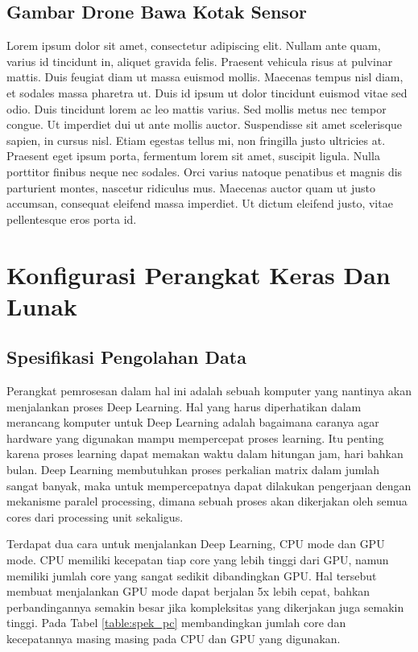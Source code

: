 \subsection{ Gambar Drone Bawa Kotak Sensor}
Lorem ipsum dolor sit amet, consectetur adipiscing elit. Nullam ante quam, varius id tincidunt in, aliquet gravida felis. Praesent vehicula risus at pulvinar mattis. Duis feugiat diam ut massa euismod mollis. Maecenas tempus nisl diam, et sodales massa pharetra ut. Duis id ipsum ut dolor tincidunt euismod vitae sed odio. Duis tincidunt lorem ac leo mattis varius. Sed mollis metus nec tempor congue. Ut imperdiet dui ut ante mollis auctor. Suspendisse sit amet scelerisque sapien, in cursus nisl. Etiam egestas tellus mi, non fringilla justo ultricies at. Praesent eget ipsum porta, fermentum lorem sit amet, suscipit ligula. Nulla porttitor finibus neque nec sodales. Orci varius natoque penatibus et magnis dis parturient montes, nascetur ridiculus mus. Maecenas auctor quam ut justo accumsan, consequat eleifend massa imperdiet. Ut dictum eleifend justo, vitae pellentesque eros porta id.

\section{ Konfigurasi Perangkat Keras Dan Lunak}
\subsection{ Spesifikasi Pengolahan Data}
Perangkat pemrosesan dalam hal ini adalah sebuah komputer yang nantinya akan menjalankan proses Deep Learning. Hal yang harus diperhatikan dalam merancang komputer untuk Deep Learning adalah bagaimana caranya agar hardware yang digunakan mampu mempercepat proses learning. Itu penting karena proses learning dapat memakan waktu dalam hitungan jam, hari bahkan bulan. Deep Learning membutuhkan proses perkalian matrix dalam jumlah sangat banyak, maka untuk mempercepatnya dapat dilakukan pengerjaan dengan mekanisme paralel processing, dimana sebuah proses akan dikerjakan oleh semua cores dari processing unit sekaligus.

Terdapat dua cara untuk menjalankan Deep Learning, CPU mode dan GPU mode. CPU memiliki kecepatan tiap core yang lebih tinggi dari GPU, namun memiliki jumlah core yang sangat sedikit dibandingkan GPU. Hal tersebut membuat menjalankan GPU mode dapat berjalan 5x lebih cepat, bahkan perbandingannya semakin besar jika kompleksitas yang dikerjakan juga semakin tinggi. Pada Tabel \ref{table:spek_pc} membandingkan jumlah core dan kecepatannya masing masing pada CPU dan GPU yang digunakan.

